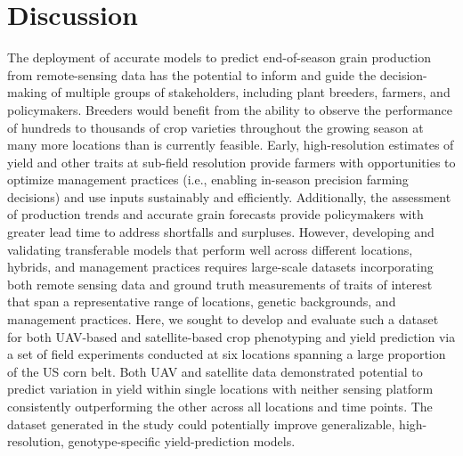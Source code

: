 \documentclass[12pt,twoside]{gsag3jnl}
\begin{document}

\section{Discussion}


The deployment of accurate models to predict end-of-season grain production from remote-sensing data has the potential to inform and guide the decision-making of multiple groups of stakeholders, including plant breeders, farmers, and policymakers.
Breeders would benefit from the ability to observe the performance of hundreds to thousands of crop varieties throughout the growing season at many more locations than is currently feasible. 
Early, high-resolution estimates of yield and other traits at sub-field resolution provide farmers with opportunities to optimize management practices (i.e., enabling in-season precision farming decisions) and use inputs sustainably and efficiently. Additionally, the assessment of production trends and accurate grain forecasts provide policymakers with greater lead time to address shortfalls and surpluses.  
However, developing and validating transferable models that perform well across different locations, hybrids, and management practices requires large-scale datasets incorporating both remote sensing data and ground truth measurements of traits of interest that span a representative range of locations, genetic backgrounds, and management practices. Here, we sought to develop and evaluate such a dataset for both UAV-based and satellite-based crop phenotyping and yield prediction via a set of field experiments conducted at six locations spanning a large proportion of the US corn belt. Both UAV and satellite data demonstrated potential to predict variation in yield within single locations with neither sensing platform consistently outperforming the other across all locations and time points. The dataset generated in the study could potentially improve generalizable, high-resolution, genotype-specific yield-prediction models. 
\end{document}
